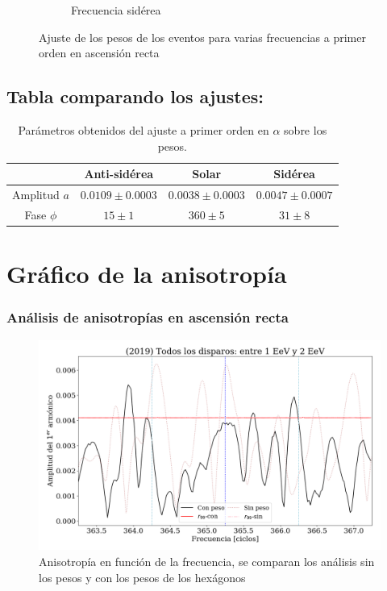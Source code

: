 \begin{figure}[H]
\begin{subfigure}{.5\textwidth}
	\caption{Frecuencia sidérea}
	\label{fig:ajuste_siderea}
\end{subfigure}%
\caption{Ajuste de los pesos de los eventos para varias frecuencias a primer orden en ascensión recta}
\end{figure}

	
\subsection{Tabla comparando los ajustes:}
		
		\begin{table}[H]
		\centering
		\begin{tabular}{c|c|c|c}
					& Anti-sidérea			& Solar 				& Sidérea\\ \hline
		Amplitud $a$& $0.0109\pm 0.0003 $ 	&	$0.0038 \pm 0.0003$	&  $0.0047\pm 0.0007$		\\
		Fase $\phi$ & $15    \pm 1$ 		&   $360 \pm 5   $ 		&  $31    \pm 8    $ 		\\
		\end{tabular}
		\caption{Parámetros obtenidos del ajuste a primer orden en $\alpha$ sobre los pesos.}
		\end{table}


\section{Gráfico de la anisotropía}
		
	\subsubsection{Análisis de anisotropías en ascensión recta}
		
		\begin{figure}[H]
			\centering
			\includegraphics[width=\linewidth]{pesos_sin_con_1_2_EeV.png}
			\caption{Anisotropía en función de la frecuencia, se comparan los análisis sin los pesos y con los pesos de los hexágonos}
		\end{figure}
		
